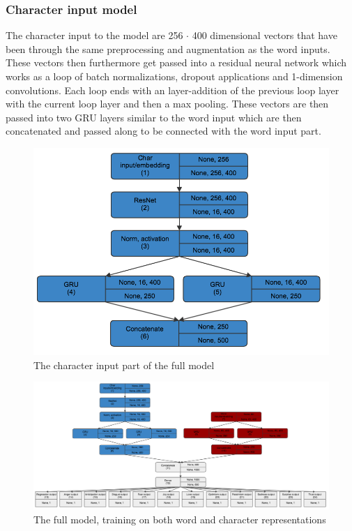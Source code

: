\subsubsection{Character input model}
The character input to the model are 256 $\cdot$ 400 dimensional vectors that have been through the same preprocessing and augmentation as the word inputs. These vectors then furthermore get passed into a residual neural network which works as a loop of batch normalizations, dropout applications and 1-dimension convolutions. Each loop ends with an layer-addition of the previous loop layer with the current loop layer and then a max pooling. These vectors are then passed into two GRU layers similar to the word input which are then concatenated and passed along to be connected with the word input part.
\begin{figure}[H]
	\centering
		\includegraphics[scale=0.25]{pictures/char_model.png}
		\caption{The character input part of the full model}
		\label{fig:charmodel}
\end{figure}
\begin{figure}[H]
    \centering
        \includegraphics[width=\textwidth]{pictures/model.png}
        \caption{The full model, training on both word and character representations}
        \label{fig:fullmodel}
\end{figure}

